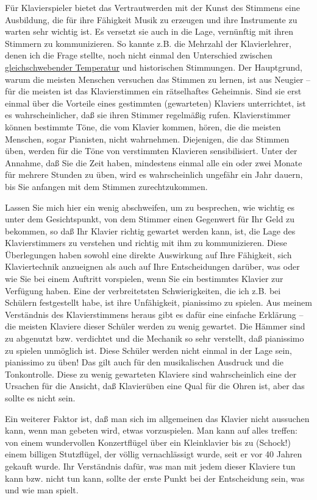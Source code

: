 Für Klavierspieler bietet das Vertrautwerden mit der Kunst des Stimmens eine Ausbildung, die für ihre Fähigkeit Musik zu erzeugen und ihre Instrumente zu warten sehr wichtig ist.
Es versetzt sie auch in die Lage, vernünftig mit ihren Stimmern zu kommunizieren.
So kannte z.B. die Mehrzahl der Klavierlehrer, denen ich die Frage stellte, noch nicht einmal den Unterschied zwischen \hyperref[et1]{gleichschwebender Temperatur} und historischen Stimmungen.
Der Hauptgrund, warum die meisten Menschen versuchen das Stimmen zu lernen, ist aus Neugier -- für die meisten ist das Klavierstimmen ein rätselhaftes Geheimnis.
Sind sie erst einmal über die Vorteile eines gestimmten (gewarteten) Klaviers unterrichtet, ist es wahrscheinlicher, daß sie ihren Stimmer regelmäßig rufen.
Klavierstimmer können bestimmte Töne, die vom Klavier kommen, hören, die die meisten Menschen, sogar Pianisten, nicht wahrnehmen.
Diejenigen, die das Stimmen üben, werden für die Töne von verstimmten Klavieren sensibilisiert.
Unter der Annahme, daß Sie die Zeit haben, mindestens einmal alle ein oder zwei Monate für mehrere Stunden zu üben, wird es wahrscheinlich ungefähr ein Jahr dauern, bis Sie anfangen mit dem Stimmen zurechtzukommen.

Lassen Sie mich hier ein wenig abschweifen, um zu besprechen, wie wichtig es unter dem Gesichtspunkt, von dem Stimmer einen Gegenwert für Ihr Geld zu bekommen, so daß Ihr Klavier richtig gewartet werden kann, ist, die Lage des Klavierstimmers zu verstehen und richtig mit ihm zu kommunizieren.
Diese Überlegungen haben sowohl eine direkte Auswirkung auf Ihre Fähigkeit, sich Klaviertechnik anzueignen als auch auf Ihre Entscheidungen darüber, was oder wie Sie bei einem Auftritt vorspielen, wenn Sie ein bestimmtes Klavier zur Verfügung haben.
Eine der verbreitetsten Schwierigkeiten, die ich z.B. bei Schülern festgestellt habe, ist ihre Unfähigkeit, pianissimo zu spielen.
Aus meinem Verständnis des Klavierstimmens heraus gibt es dafür eine einfache Erklärung -- die meisten Klaviere dieser Schüler werden zu wenig gewartet.
Die Hämmer sind zu abgenutzt bzw. verdichtet und die Mechanik so sehr verstellt, daß pianissimo zu spielen unmöglich ist.
Diese Schüler werden nicht einmal in der Lage sein, pianissimo zu üben!
Das gilt auch für den musikalischen Ausdruck und die Tonkontrolle.
Diese zu wenig gewarteten Klaviere sind wahrscheinlich eine der Ursachen für die Ansicht, daß Klavierüben eine Qual für die Ohren ist, aber das sollte es nicht sein.

Ein weiterer Faktor ist, daß man sich im allgemeinen das Klavier nicht aussuchen kann, wenn man gebeten wird, etwas vorzuspielen.
Man kann auf alles treffen: von einem wundervollen Konzertflügel über ein Kleinklavier bis zu (Schock!) einem billigen Stutzflügel, der völlig vernachlässigt wurde, seit er vor 40 Jahren gekauft wurde.
Ihr Verständnis dafür, was man mit jedem dieser Klaviere tun kann bzw. nicht tun kann, sollte der erste Punkt bei der Entscheidung sein, was und wie man spielt.

